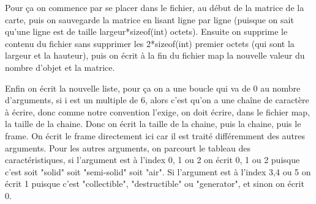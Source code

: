 \documentclass[10pt,a4paper]{article}
\begin{document}
            Pour ça on commence par se placer dans le fichier, au début de la matrice de la carte, puis on sauvegarde la matrice en lisant ligne par ligne (puisque on sait qu'une ligne est de taille largeur*sizeof(int) octets).
            Ensuite on supprime le contenu du fichier sans supprimer les 2*sizeof(int) premier octets (qui sont la largeur et la hauteur), puis on écrit à la fin du fichier map la nouvelle valeur du nombre d'objet et la matrice.
            
            Enfin on écrit la nouvelle liste, pour ça on a une boucle qui va de 0 au nombre d'arguments, si i est un multiple de 6, alors c'est qu'on a une chaîne de caractère à écrire, donc comme notre convention l'exige, on doit écrire, dans le fichier map, la taille de la chaine. Donc on écrit la taille de la chaine, puis la chaine, puis le frame. On écrit le frame directement ici car il est traité différemment des autres arguments.
            Pour les autres arguments, on parcourt le tableau des caractéristiques, si l'argument est à l'index 0, 1 ou 2 on écrit 0, 1 ou 2 puisque c'est soit "solid" soit "semi-solid" soit "air". Si l'argument est à l'index 3,4 ou 5 on écrit 1 puisque c'est "collectible", "destructible" ou "generator", et sinon on écrit 0. 
            
\end{document}
